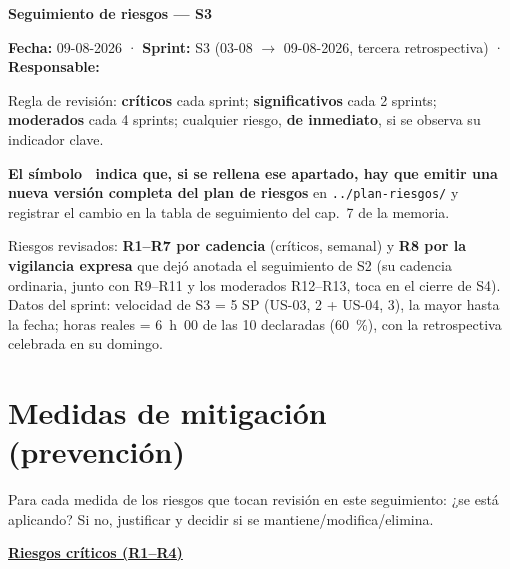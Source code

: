 \documentclass[11pt,a4paper]{article}
\begin{document}
\begin{center}
  {\LARGE\bfseries Seguimiento de riesgos — S3}\\[6pt]
\end{center}

\textbf{Fecha:} 09-08-2026 · \textbf{Sprint:} S3 (03-08 \(\to\) 09-08-2026, tercera retrospectiva) · \textbf{Responsable:} \thesisAuthor

Regla de revisión: \textbf{críticos} cada sprint; \textbf{significativos} cada 2 sprints; \textbf{moderados} cada 4 sprints; cualquier riesgo, \textbf{de inmediato}, si se observa su indicador clave.

\textbf{El símbolo \updatesymbol\ indica que, si se rellena ese apartado, hay que emitir una nueva versión completa del plan de riesgos} en \texttt{../plan-riesgos/} y registrar el cambio en la tabla de seguimiento del cap.~7 de la memoria.

Riesgos revisados: \textbf{R1--R7 por cadencia} (críticos, semanal) y \textbf{R8 por la vigilancia expresa} que dejó anotada el seguimiento de S2 (su cadencia ordinaria, junto con R9--R11 y los moderados R12--R13, toca en el cierre de S4).
Datos del sprint: velocidad de S3 = 5 SP (US-03, 2 + US-04, 3), la mayor hasta la fecha; horas reales = 6~h~00 de las 10 declaradas (60~\%), con la retrospectiva celebrada en su domingo.

\bigline

\section{Medidas de mitigación (prevención)}

Para cada medida de los riesgos que tocan revisión en este seguimiento: ¿se está aplicando?
Si no, justificar y decidir si se mantiene/modifica/elimina.

\underline{\textbf{Riesgos críticos (R1--R4)}}
\end{document}
